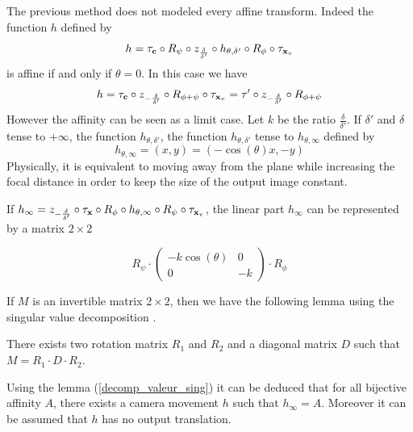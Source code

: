 \begin{remarque}
The previous method does not modeled every affine transform. Indeed the function $h$ defined by 
\begin{equation*}
h = \tau_{\mathbf{c}}   \circ R_{\psi} \circ z_{\frac{\delta}{\delta'}} \circ h_{\theta,\delta'} \circ R_{\phi} \circ \tau_{\mathbf{x}_v}
\end{equation*}
is affine if and only if $\theta=0$. In this case we have
\begin{equation*}
h= \tau_{\mathbf{c}} \circ z_{-\frac{\delta}{\delta'}} \circ R_{\phi+\psi} \circ \tau_{\mathbf{x}_{v}}
=\tau' \circ z_{-\frac{\delta}{\delta'}} \circ  R_{\phi+\psi}
\end{equation*}
However the affinity can be seen as a limit case. Let $k$ be the ratio $\frac{\delta}{\delta'}$. If $\delta'$ and $\delta$ tense to $+\infty$, the function $h_{\theta,\delta'}$, the function $h_{\theta,\delta'}$ tense to $h_{\theta,\infty}$ defined by
\begin{equation*}
h_{\theta,\infty}=(x,y)=(-\cos(\theta)x,-y)
\end{equation*}
Physically, it is equivalent to moving away from the plane while increasing the focal distance in order to keep the size of the output image constant.

If $h_\infty = z_{-\frac{\delta}{\delta'}} \circ \tau_{\mathbf{x}} \circ R_{\phi} \circ h_{\theta,\infty} \circ R_{\psi} \circ \tau_{\mathbf{x}_{v}}$, the linear part $h_{\infty}$ can be represented by a matrix $2\times2$

\begin{equation*}
R_{\psi} \cdot 
\begin{pmatrix}
-k\cos(\theta)&0\\
0&-k
\end{pmatrix}
\cdot R_{\phi}
\end{equation*}

If $M$ is an invertible matrix $2\times 2$, then we have the following lemma using the singular value decomposition \cite{morel2009asift}.
\begin{lem}
There exists two rotation matrix $R_1$ and $R_2$ and a diagonal matrix $D$ such that $M = R_1 \cdot D \cdot R_2$.
\label{decomp_valeur_sing}
\end{lem}

Using the lemma (\ref{decomp_valeur_sing}) it can be deduced that for all bijective affinity $A$, there exists a camera movement $h$ such that $h_\infty = A$. Moreover it can be assumed that $h$ has no output translation.
\end{remarque}






